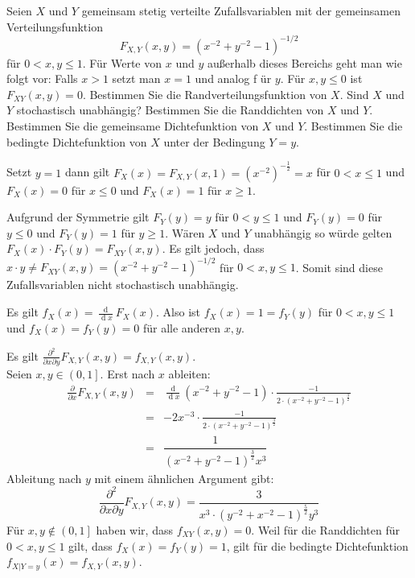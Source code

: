 \begin{Exercise}
	Seien $X$ und $Y$ gemeinsam stetig verteilte Zufallsvariablen mit
	der gemeinsamen Verteilungsfunktion%
	\begin{equation*}
		F_{X,Y}(x,y)=\left( x^{-2}+y^{-2}-1\right) ^{-1/2}
	\end{equation*}%
	f\"{u}r $0<x,y\leq 1$. F\"{u}r Werte von $x$ und $y$ au\ss erhalb dieses
	Bereichs geht man wie folgt vor: Falls $x>1$ setzt man $x=1$ und analog f%
	\"{u}r $y$. F\"{u}r $x,y\leq 0$ ist $F_{XY}(x,y)=0.$
		\Question Bestimmen Sie die Randverteilungsfunktion von $X$.
		\Question Sind $X$ und $Y$ stochastisch unabh\"{a}ngig?
		\Question Bestimmen Sie die Randdichten von $X$ und $Y$.
		\Question Bestimmen Sie die gemeinsame Dichtefunktion von $X$ und $Y$.
		\Question Bestimmen Sie die bedingte Dichtefunktion von $X$ unter der Bedingung $%
		Y=y$. 
\end{Exercise}

\begin{Answer}
	\Question Setzt $y=1$ dann gilt $F_X(x)=F_{X,Y}(x,1)=\left(x^{-2}\right)^{-\frac{1}{2}}=x$ für $0<x\leq1$ und $F_X(x)=0$ für $x\leq 0$ und $F_X(x)=1$ für $x\geq1$.
	
	\Question Aufgrund der Symmetrie gilt $F_Y(y)=y$ für $0<y\leq1$ und $F_Y(y)=0$ für $y\leq 0$ und $F_Y(y)=1$ für $y\geq1$. Wären $X$ und $Y$ unabhängig so würde gelten $F_X(x)\cdot F_Y(y)=F_{XY}(x,y)$. Es gilt jedoch, dass $x\cdot y\neq F_{XY}(x,y)=\left( x^{-2}+y^{-2}-1\right) ^{-1/2}$ für $0<x,y\leq1$. Somit sind diese Zufallsvariablen nicht stochastisch unabhängig.
	
	\Question Es gilt $f_X(x)=\frac{\operatorname{d}}{\operatorname{d}x}F_X(x)$. Also ist $f_X(x)=1=f_Y(y)$ für $0<x,y\leq 1$ und $f_X(x)=f_Y(y)=0$ für alle anderen $x,y$.
	
	\Question Es gilt $\frac{\partial^2 }{\partial x\partial y}F_{X,Y}(x,y)=f_{X,Y}(x,y)$.\\
	Seien $x,y\in\left(0,1\right]$. Erst nach $x$ ableiten:
	\begin{eqnarray*}
		\frac{\partial}{\partial x}F_{X,Y}(x,y)&=&\frac{\operatorname{d}}{\operatorname{d}x}\left( x^{-2}+y^{-2}-1\right)\cdot \frac{-1}{2\cdot \left(x^{-2}+y^{-2}-1\right)^{\frac{3}{2}}}\\
		&=&-2x^{-3}\cdot\frac{-1}{2\cdot \left(x^{-2}+y^{-2}-1\right)^{\frac{3}{2}}}\\
		&=& \dfrac{1}{\left(x^{-2}+y^{-2}-1\right)^\frac{3}{2}x^3}
	\end{eqnarray*}
	Ableitung nach $y$ mit einem ähnlichen Argument gibt:
	\begin{equation*}
		\frac{\partial^2}{\partial x\partial y}F_{X,Y}(x,y)=\dfrac{3}{x^3\cdot\left(y^{-2}+x^{-2}-1\right)^\frac{5}{2}y^3}
	\end{equation*}
	Für $x,y\notin\left(0,1\right]$ haben wir, dass $f_{XY}(x,y)=0$.
	\Question Weil für die Randdichten für $0<x,y\leq1$ gilt, dass $f_X(x)=f_Y(y)=1$, gilt für die bedingte Dichtefunktion $f_{X\vert Y=y}(x)=f_{X,Y}(x,y)$.
\end{Answer}

